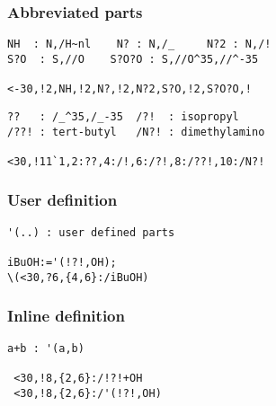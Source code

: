 \documentclass[a4paper]{article}
\begin{document}
\subsubsection{Abbreviated parts}
%
%
%
%
%
\begin{verbatim}
NH  : N,/H~nl    N? : N,/_     N?2 : N,/!
S?O  : S,//O    S?O?O : S,//O^35,//^-35

<-30,!2,NH,!2,N?,!2,N?2,S?O,!2,S?O?O,!
\end{verbatim}
%
%
%
%
\begin{verbatim}
??   : /_^35,/_-35  /?!  : isopropyl
/??! : tert-butyl   /N?! : dimethylamino

<30,!11`1,2:??,4:/!,6:/?!,8:/??!,10:/N?!
\end{verbatim}
\subsubsection{User definition}
\begin{verbatim}
'(..) : user defined parts

iBuOH:='(!?!,OH);
\(<30,?6,{4,6}:/iBuOH)
\end{verbatim}
\subsubsection{Inline definition}
\index{+}%
\begin{verbatim}
a+b : '(a,b)

 <30,!8,{2,6}:/!?!+OH
 <30,!8,{2,6}:/'(!?!,OH)
\end{verbatim}
\end{document}
